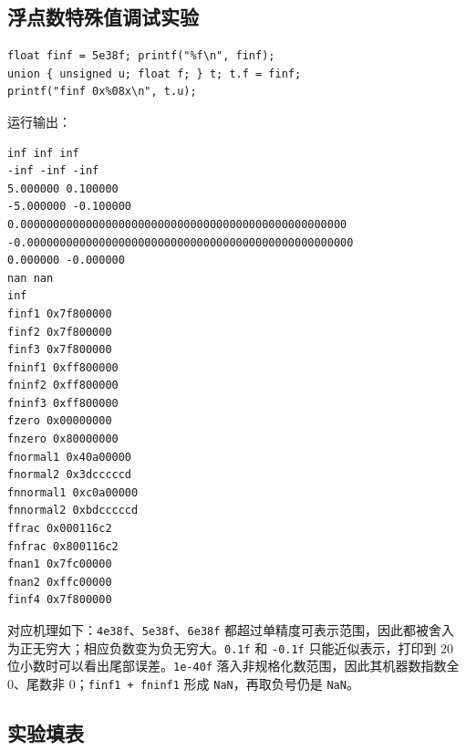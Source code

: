 \documentclass[12pt, a4paper]{academics}
\begin{document}
\subsection{浮点数特殊值调试实验}

\begin{verbatim}
float finf = 5e38f; printf("%f\n", finf);
union { unsigned u; float f; } t; t.f = finf;
printf("finf 0x%08x\n", t.u);
\end{verbatim}

运行输出：
\begin{verbatim}
inf inf inf
-inf -inf -inf
5.000000 0.100000 
-5.000000 -0.100000
0.00000000000000000000000000000000000000000000000000
-0.00000000000000000000000000000000000000000000000000
0.000000 -0.000000
nan nan
inf 
finf1 0x7f800000
finf2 0x7f800000
finf3 0x7f800000
fninf1 0xff800000
fninf2 0xff800000
fninf3 0xff800000
fzero 0x00000000
fnzero 0x80000000
fnormal1 0x40a00000
fnormal2 0x3dcccccd
fnnormal1 0xc0a00000
fnnormal2 0xbdcccccd
ffrac 0x000116c2
fnfrac 0x800116c2
fnan1 0x7fc00000
fnan2 0xffc00000
finf4 0x7f800000
\end{verbatim}

对应机理如下：\texttt{4e38f}、\texttt{5e38f}、\texttt{6e38f} 都超过单精度可表示范围，因此都被舍入为正无穷大；相应负数变为负无穷大。\texttt{0.1f} 和 \texttt{-0.1f} 只能近似表示，打印到 20 位小数时可以看出尾部误差。\texttt{1e-40f} 落入非规格化数范围，因此其机器数指数全 0、尾数非 0；\texttt{finf1 + fninf1} 形成 \texttt{NaN}，再取负号仍是 \texttt{NaN}。

\subsection{实验填表}
\end{document}
